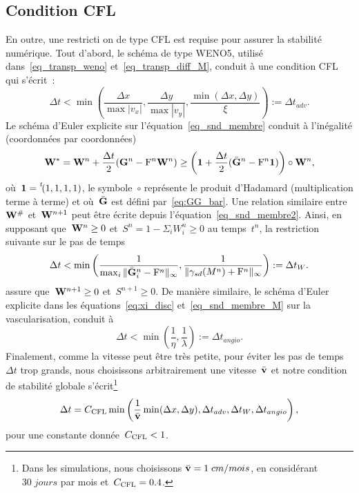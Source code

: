 \documentclass[main.tex]{subfiles}
\begin{document}
\subsection{Condition CFL}

En outre, une restricti on de type CFL est requise pour assurer la stabilité numérique. Tout d'abord, le schéma de type WENO5, utilisé dans~\eqref{eq_transp_weno} et~\eqref{eq_transp_diff_M}, conduit à une condition CFL qui s'écrit~:
\begin{equation}\label{eq:CFL-weno}
\Delta t < \min \left( \frac{\Delta x}{\max |v_x|} , \frac{\Delta y}{\max |v_y|}, \frac{\min(\Delta x , \Delta y )}{\xi}\right) := \Delta t_{adv}.
\end{equation}
Le schéma d'Euler explicite sur l'équation~\eqref{eq_snd_membre} conduit à l'inégalité 
(coordonnées par coordonnées)
$$
{\bf W}^{*}={\bf W}^n+\frac{\Delta t}{2} ({\bf G}^n -{\rm F}^n{\bf W}^n) \geq 
\left( \mathbf{1}+\frac{\Delta t}{2} (\bar{{\bf G}}^n - {\rm F}^n\mathbf{1} )\right) \circ {\bf W}^n,
$$
où~$\mathbf{1}=\prescript{\mathit{t\!}}{}{(1,1,1,1)}$, le symbole~$\circ$ représente le produit d'Hadamard (multiplication terme à terme) et où~$\bar{{\bf G}}$ est défini par~\eqref{eq:GG_bar}. 
Une relation similaire entre~${\bf W}^\#$ et~${\bf W}^{n+1}$ 
peut être écrite depuis l'équation~\eqref{eq_snd_membre2}. 
Ainsi, en supposant que~${\bf W}^n\geq 0$ et~$S^n=1-\Sigma_i W^n_i\geq 0$ 
au temps~$t^n$, la restriction suivante sur le pas de temps
\begin{equation}\label{eq:CFL-spliting-pop}
\Delta t < \min \left( \dfrac{1}{ \max_i \|  \bar{{\bf G}}_i^n-{\rm F}^n \|_\infty} , \dfrac{1}{ \| \gamma_{sd}(M^n) + {\rm F}^n  \|_{\infty}} \right) := \Delta t_{W}.
\end{equation}
assure que~${\bf W}^{n+1}\geq 0$ et~$S^{n+1}\geq 0$. 
De manière similaire, le schéma d'Euler explicite dans les équations~\eqref{eq:xi_disc} et~\eqref{eq_snd_membre_M} 
sur la vascularisation, conduit à
\begin{equation}\label{eq:CFL-spliting-vasc}
\Delta t < \min \left(  \frac{1}{\eta} , \frac{1}{\lambda}\right) := \Delta t_{angio}.
\end{equation}
Finalement, comme la vitesse peut être très petite, pour éviter les pas de temps 
$\Delta t$ trop grands, nous choisissons arbitrairement une vitesse~$\bar{\mathbf{v}}$ et notre condition de stabilité globale s'écrit\footnote{Dans les simulations, nous choisissons 
$\bar{\mathbf{v}}=1\;cm/mois$, en considérant~$30\;jours$ par mois et~$C_{{\mathrm{CFL}}}=0.4$.} 
\begin{equation}\label{eq:dt}
\Delta t =C_{{\mathrm{CFL}}}\min \left( \frac{1}{{\bar{\mathbf{v}}}} \min( \Delta x, \Delta y) , \Delta t_{adv}, \Delta t_{W} , \Delta t_{angio} \right),
\end{equation}
pour une constante donnée~$C_{{\mathrm{CFL}}}<1$.
\end{document}
